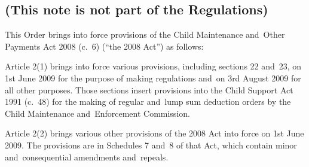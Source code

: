 \documentclass[12pt,a4paper]{article}
\begin{document}
\renewcommand\parthead{— Explanatory Note}

\subsection*{(This note is not part of the Regulations)}

This Order brings into force provisions of the Child Maintenance and~Other Payments Act 2008 (c.~6) (“the 2008 Act”) as follows:

Article 2(1) brings into force various provisions, including sections 22 and~23, on 1st June 2009 for the purpose of making regulations and~on 3rd August 2009 for all other purposes. Those sections insert provisions into the Child Support Act 1991 (c.~48) for the making of regular and~lump sum deduction orders by the Child Maintenance and~Enforcement Commission.

Article 2(2) brings various other provisions of the 2008 Act into force on 1st June 2009. The provisions are in Schedules 7 and~8 of that Act, which contain minor and~consequential amendments and~repeals. 
\end{document}
